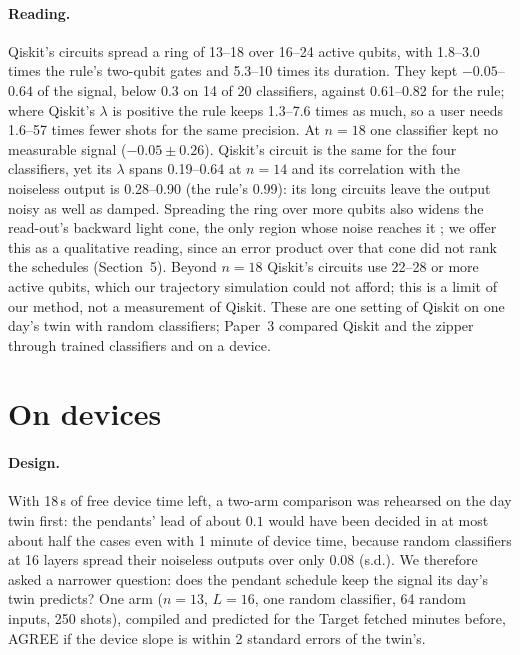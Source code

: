 \documentclass[11pt]{article}
\begin{document}
\paragraph{Reading.} Qiskit's circuits spread a ring of 13--18 over 16--24 active qubits, with 1.8--3.0 times the rule's
two-qubit gates and 5.3--10 times its duration. They kept $-0.05$--$0.64$ of the signal, below 0.3 on 14 of 20
classifiers, against 0.61--0.82 for the rule; where Qiskit's $\lambda$ is positive the rule keeps 1.3--7.6 times as
much, so a user needs 1.6--57 times fewer shots for the same precision. At $n = 18$ one classifier kept no measurable
signal ($-0.05 \pm 0.26$). Qiskit's circuit is the same for the four classifiers, yet its $\lambda$ spans 0.19--0.64 at
$n = 14$ and its correlation with the noiseless output is 0.28--0.90 (the rule's 0.99): its long circuits leave the
output noisy as well as damped. Spreading the ring over more qubits also widens the read-out's backward light cone,
the only region whose noise reaches it \cite{tran2023}; we offer this as a qualitative reading, since an error product
over that cone did not rank the schedules (Section~5). Beyond $n = 18$ Qiskit's circuits use 22--28 or more active qubits, which our trajectory
simulation could not afford; this is a limit of our method, not a measurement of Qiskit. These are one setting of
Qiskit on one day's twin with random classifiers; Paper~3 \cite{paper3} compared Qiskit and the zipper through trained
classifiers and on a device.

\section{On devices}

\paragraph{Design.} With 18\,s of free device time left, a two-arm comparison was rehearsed on the day twin first: the
pendants' lead of about $0.1$ would have been decided in at most about half the cases even with 1 minute of device
time, because random classifiers at 16 layers spread their noiseless outputs over only $0.08$ (s.d.). We therefore
asked a narrower question: does the pendant schedule keep the signal its day's twin predicts? One arm ($n=13$, $L=16$,
one random classifier, 64 random inputs, 250 shots), compiled and predicted for the Target fetched minutes before,
AGREE if the device slope is within 2 standard errors of the twin's.
\end{document}
